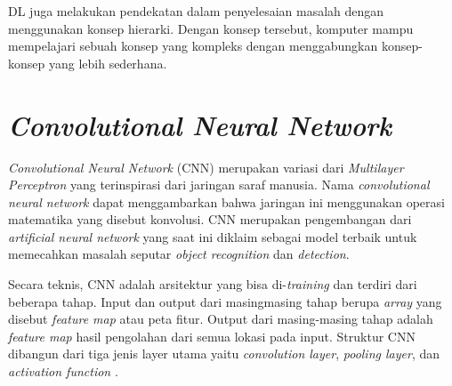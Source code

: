 DL juga melakukan pendekatan dalam penyelesaian masalah dengan menggunakan konsep hierarki.
Dengan konsep tersebut, komputer mampu mempelajari sebuah konsep yang kompleks dengan menggabungkan
konsep-konsep yang lebih sederhana.

\section{\textit{Convolutional Neural Network}}
\textit{Convolutional Neural Network} (CNN) merupakan variasi dari \textit{Multilayer Perceptron} yang terinspirasi dari jaringan saraf manusia\citep{CNN2017}.
Nama \textit{convolutional neural network} dapat menggambarkan bahwa jaringan ini menggunakan operasi matematika yang disebut konvolusi.
CNN merupakan pengembangan dari \textit{artificial neural network} yang saat ini diklaim sebagai model terbaik untuk memecahkan masalah
seputar \textit{object recognition} dan \textit{detection}.

Secara teknis, CNN adalah arsitektur yang bisa di-\textit{training}
dan terdiri dari beberapa tahap. Input dan output dari masingmasing tahap berupa \textit{array} yang disebut \textit{feature map} atau peta fitur. Output dari masing-masing tahap adalah \textit{feature map} hasil pengolahan dari semua lokasi pada input. Struktur CNN dibangun dari tiga jenis layer utama yaitu \textit{convolution layer}, \textit{pooling layer}, dan \textit{activation function} \citep{CNN2017}.

